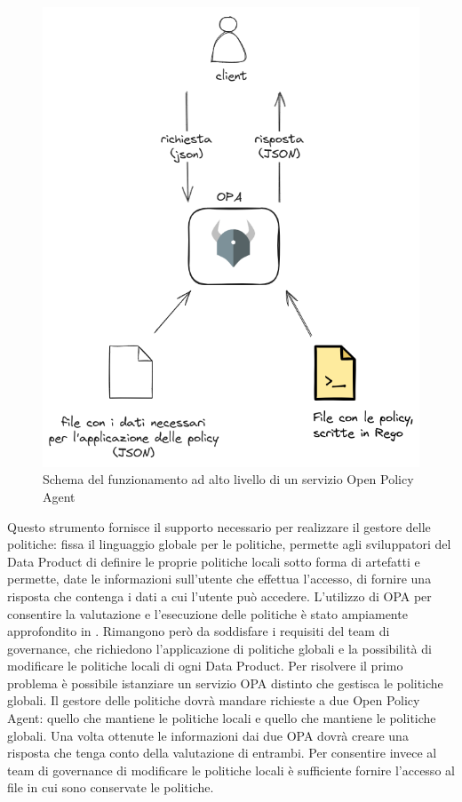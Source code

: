\documentclass[a4paper,12pt]{report}
\begin{document}
\begin{figure}[t]
    \centering
    \includegraphics[width= 0.75\linewidth]{immagini/Opa funzionamento.png}
    \caption{Schema del funzionamento ad alto livello di un servizio Open Policy Agent}
    \label{OPA image}
\end{figure}
Questo strumento fornisce il supporto necessario per realizzare il gestore delle politiche: fissa il linguaggio globale per le politiche, permette agli sviluppatori del Data Product di definire le proprie politiche locali sotto forma di artefatti e permette, date le informazioni sull'utente che effettua l'accesso, di fornire una risposta che contenga i dati a cui l'utente può accedere.
L'utilizzo di OPA per consentire la valutazione e l'esecuzione delle politiche è stato ampiamente approfondito in \cite{caronni2022framework}.
Rimangono però da soddisfare i requisiti del team di governance, che richiedono l'applicazione di politiche globali e la possibilità di modificare le politiche locali di ogni Data Product.
Per risolvere il primo problema è possibile istanziare un servizio OPA distinto che gestisca le politiche globali.
Il gestore delle politiche dovrà mandare richieste a due Open Policy Agent: quello che mantiene le politiche locali e quello che mantiene le politiche globali.
Una volta ottenute le informazioni dai due OPA dovrà creare una risposta che tenga conto della valutazione di entrambi.
Per consentire invece al team di governance di modificare le politiche locali è sufficiente fornire l'accesso al file in cui sono conservate le politiche.
\end{document}
